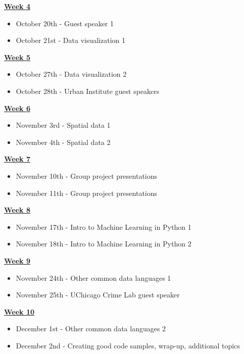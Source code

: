 \documentclass{article}
\begin{document}
\noindent
\textbf{\underline{Week 4}}
\begin{itemize}
\item October 20th - Guest speaker 1
\item October 21st - Data visualization 1
\end{itemize}
\bigskip

\noindent
\textbf{\underline{Week 5}}
\begin{itemize}
\item October 27th - Data visualization 2
\item October 28th - Urban Institute guest speakers
\end{itemize}
\bigskip

\noindent
\textbf{\underline{Week 6}}
\begin{itemize}
\item November 3rd - Spatial data 1
\item November 4th - Spatial data 2
\end{itemize}
\bigskip

\noindent
\textbf{\underline{Week 7}}
\begin{itemize}
\item November 10th - Group project presentations
\item November 11th - Group project presentations
\end{itemize}
\bigskip

\noindent
\textbf{\underline{Week 8}}
\begin{itemize}
\item November 17th - Intro to Machine Learning in Python 1
\item November 18th - Intro to Machine Learning in Python 2
\end{itemize}
\bigskip

\noindent
\textbf{\underline{Week 9}}
\begin{itemize}
\item November 24th - Other common data languages 1
\item November 25th - UChicago Crime Lab guest speaker
\end{itemize}
\bigskip

\noindent
\textbf{\underline{Week 10}}
\begin{itemize}
\item December 1st - Other common data languages 2
\item December 2nd - Creating good code samples, wrap-up, additional topics
\end{itemize}
\bigskip
\end{document}
